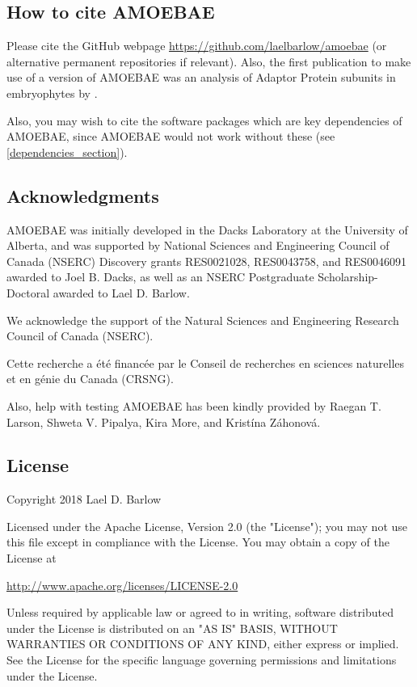 \documentclass[12pt,letterpaper]{article}
\begin{document}
\begin{linenumbers}
\subsection{How to cite AMOEBAE}

Please cite the GitHub webpage \url{https://github.com/laelbarlow/amoebae} (or
alternative permanent repositories if relevant). Also, the first publication to
make use of a version of AMOEBAE was an analysis of Adaptor Protein subunits in
embryophytes by \cite{larson2019}.

Also, you may wish to cite the software packages which are key dependencies of
AMOEBAE, since AMOEBAE would not work without these (see
\autoref*{dependencies_section}).

\subsection{Acknowledgments}

AMOEBAE was initially developed in the Dacks Laboratory at the University of
Alberta, and was supported by National Sciences and Engineering Council of
Canada (NSERC) Discovery grants RES0021028, RES0043758, and RES0046091 awarded
to Joel B. Dacks, as well as an NSERC Postgraduate Scholarship-Doctoral awarded
to Lael D. Barlow.

We acknowledge the support of the Natural Sciences and Engineering Research Council of Canada (NSERC).

Cette recherche a \'et\'e financ\'ee par le Conseil de recherches en sciences naturelles et en g\'enie du Canada (CRSNG).

Also, help with testing AMOEBAE has been kindly provided by Raegan T. Larson,
Shweta V. Pipalya, Kira More, and Krist\'ina Z\'ahonov\'a.

\subsection{License}
\label{license_section}

Copyright 2018 Lael D. Barlow

Licensed under the Apache License, Version 2.0 (the "License"); you may not use this file except in compliance with the License. You may obtain a copy of the License at

\url{http://www.apache.org/licenses/LICENSE-2.0}

Unless required by applicable law or agreed to in writing, software distributed under the License is distributed on an "AS IS" BASIS, WITHOUT WARRANTIES OR CONDITIONS OF ANY KIND, either express or implied. See the License for the specific language governing permissions and limitations under the License.



\end{linenumbers}
\end{document}
